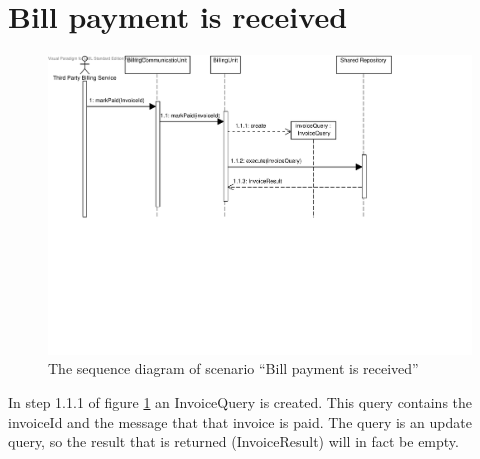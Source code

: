 \section{Bill payment is received}
\label{scenario:bill-paid}

\begin{figure}[H]
	\begin{centering}
		\includegraphics[width=\textwidth]{figs/scenario-5-14.pdf}
		\caption{The sequence diagram of scenario ``Bill payment is received''}
		\label{fig:scenario-5-14}
	\end{centering}
\end{figure}

\npar In step 1.1.1 of figure \ref{fig:scenario-5-14} an InvoiceQuery is
created. This query contains the invoiceId and the message that that invoice is
paid. The query is an update query, so the result that is returned
(InvoiceResult) will in fact be empty.
